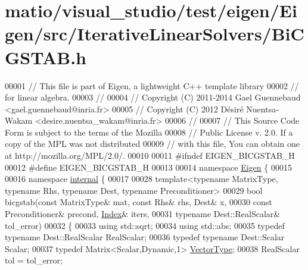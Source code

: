 \hypertarget{matio_2visual__studio_2test_2eigen_2_eigen_2src_2_iterative_linear_solvers_2_bi_c_g_s_t_a_b_8h_source}{}\section{matio/visual\+\_\+studio/test/eigen/\+Eigen/src/\+Iterative\+Linear\+Solvers/\+Bi\+C\+G\+S\+T\+AB.h}
\label{matio_2visual__studio_2test_2eigen_2_eigen_2src_2_iterative_linear_solvers_2_bi_c_g_s_t_a_b_8h_source}

\begin{DoxyCode}
00001 \textcolor{comment}{// This file is part of Eigen, a lightweight C++ template library}
00002 \textcolor{comment}{// for linear algebra.}
00003 \textcolor{comment}{//}
00004 \textcolor{comment}{// Copyright (C) 2011-2014 Gael Guennebaud <gael.guennebaud@inria.fr>}
00005 \textcolor{comment}{// Copyright (C) 2012 Désiré Nuentsa-Wakam <desire.nuentsa\_wakam@inria.fr>}
00006 \textcolor{comment}{//}
00007 \textcolor{comment}{// This Source Code Form is subject to the terms of the Mozilla}
00008 \textcolor{comment}{// Public License v. 2.0. If a copy of the MPL was not distributed}
00009 \textcolor{comment}{// with this file, You can obtain one at http://mozilla.org/MPL/2.0/.}
00010 
00011 \textcolor{preprocessor}{#ifndef EIGEN\_BICGSTAB\_H}
00012 \textcolor{preprocessor}{#define EIGEN\_BICGSTAB\_H}
00013 
00014 \textcolor{keyword}{namespace }\hyperlink{namespace_eigen}{Eigen} \{ 
00015 
00016 \textcolor{keyword}{namespace }\hyperlink{namespaceinternal}{internal} \{
00017 
00028 \textcolor{keyword}{template}<\textcolor{keyword}{typename} MatrixType, \textcolor{keyword}{typename} Rhs, \textcolor{keyword}{typename} Dest, \textcolor{keyword}{typename} Preconditioner>
00029 \textcolor{keywordtype}{bool} bicgstab(\textcolor{keyword}{const} MatrixType& mat, \textcolor{keyword}{const} Rhs& rhs, Dest& x,
00030               \textcolor{keyword}{const} Preconditioner& precond, \hyperlink{namespace_eigen_a62e77e0933482dafde8fe197d9a2cfde}{Index}& iters,
00031               \textcolor{keyword}{typename} Dest::RealScalar& tol\_error)
00032 \{
00033   \textcolor{keyword}{using} std::sqrt;
00034   \textcolor{keyword}{using} std::abs;
00035   \textcolor{keyword}{typedef} \textcolor{keyword}{typename} Dest::RealScalar RealScalar;
00036   \textcolor{keyword}{typedef} \textcolor{keyword}{typename} Dest::Scalar Scalar;
00037   \textcolor{keyword}{typedef} Matrix<Scalar,Dynamic,1> \hyperlink{struct_vector_type}{VectorType};
00038   RealScalar tol = tol\_error;

\end{DoxyCode}
